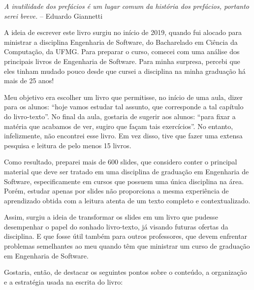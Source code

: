 \documentclass[
  11pt,
  twoside]{book}
\renewenvironment{quote}{\centering \vspace{1.5ex} \begin{tcolorbox}[colback=backcolor, width=4.9in]}{\end{tcolorbox}}
\begin{document}
\begin{quote}
\emph{A inutilidade dos prefácios é um lugar comum da história dos
prefácios, portanto serei breve.} -- Eduardo Giannetti
\end{quote}

A ideia de escrever este livro surgiu no início de 2019, quando fui
alocado para ministrar a disciplina Engenharia de Software, do
Bacharelado em Ciência da Computação, da UFMG. Para preparar o curso,
comecei com uma análise dos principais livros de Engenharia de Software.
Para minha surpresa, percebi que eles tinham mudado pouco desde que
cursei a disciplina na minha graduação há mais de 25 anos!

Meu objetivo era escolher um livro que permitisse, no início de uma
aula, dizer para os alunos: ``hoje vamos estudar tal assunto, que
corresponde a tal capítulo do livro-texto''. No final da aula, gostaria
de sugerir aos alunos: ``para fixar a matéria que acabamos de ver,
sugiro que façam tais exercícios''. No entanto, infelizmente, não
encontrei esse livro. Em vez disso, tive que fazer uma extensa pesquisa
e leitura de pelo menos 15 livros.

Como resultado, preparei mais de 600 slides, que considero conter o
principal material que deve ser tratado em uma disciplina de graduação
em Engenharia de Software, especificamente em cursos que possuem uma
única disciplina na área. Porém, estudar apenas por slides não
proporciona a mesma experiência de aprendizado obtida com a leitura
atenta de um texto completo e contextualizado.

Assim, surgiu a ideia de transformar os slides em um livro que pudesse
desempenhar o papel do sonhado livro-texto, já visando futuras ofertas
da disciplina. E que fosse útil também para outros professores, que
devem enfrentar problemas semelhantes ao meu quando têm que ministrar um
curso de graduação em Engenharia de Software.

Gostaria, então, de destacar os seguintes pontos sobre o conteúdo, a
organização e a estratégia usada na escrita do livro:
\end{document}
